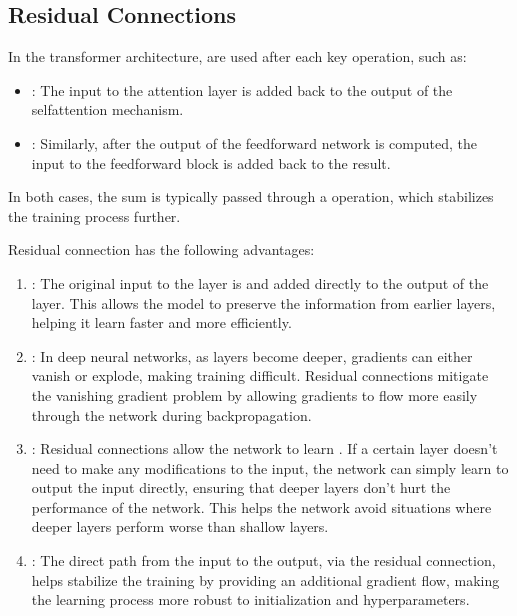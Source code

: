 \documentclass[letterpaper,11pt,english]{sphinxmanual}
\begin{document}
\subsection{Residual Connections}
\label{\detokenize{pretraining:residual-connections}}
\sphinxAtStartPar
In the transformer architecture,  are used after
each key operation, such as:
\begin{itemize}
\item {} 
\sphinxAtStartPar
{}: The input to the attention layer is added
back to the output of the self\sphinxhyphen{}attention mechanism.

\item {} 
\sphinxAtStartPar
{}: Similarly, after the output of the
feed\sphinxhyphen{}forward network is computed, the input to the feed\sphinxhyphen{}forward block
is added back to the result.

\end{itemize}

\sphinxAtStartPar
In both cases, the sum is typically passed through a  operation, which stabilizes the training process
further.

\sphinxAtStartPar
Residual connection has the following advantages:
\begin{enumerate}
%
\item {} 
\sphinxAtStartPar
{}: The original input to the layer is  and added directly to the output of the layer. This allows the
model to preserve the information from earlier layers, helping it
learn faster and more efficiently.

\item {} 
\sphinxAtStartPar
{}: In deep neural networks, as layers
become deeper, gradients can either vanish or explode, making
training difficult. Residual connections mitigate the vanishing
gradient problem by allowing gradients to flow more easily through
the network during backpropagation.

\item {} 
\sphinxAtStartPar
{}: Residual connections allow the
network to learn . If a certain layer doesn’t
need to make any modifications to the input, the network can simply
learn to output the input directly, ensuring that deeper layers don’t
hurt the performance of the network. This helps the network avoid
situations where deeper layers perform worse than shallow layers.

\item {} 
\sphinxAtStartPar
{}: The direct path from the input to the
output, via the residual connection, helps stabilize the training by
providing an additional gradient flow, making the learning process
more robust to initialization and hyperparameters.

\end{enumerate}
\end{document}
